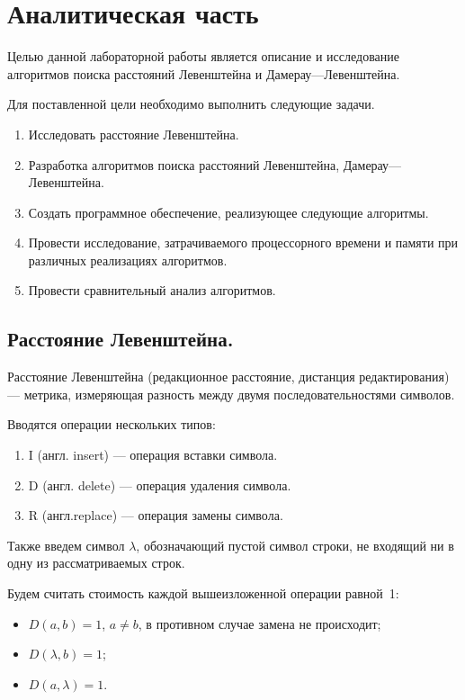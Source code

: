 \chapter{Аналитическая часть}
\label{sec:targets}
Целью данной лабораторной работы является описание и исследование алгоритмов поиска расстояний Левенштейна и Дамерау---Левенштейна.


Для поставленной цели необходимо выполнить следующие задачи.
\begin{enumerate}
	\item Исследовать расстояние Левенштейна.
	\item Разработка алгоритмов поиска расстояний Левенштейна, Дамерау---Левенштейна.
	\item Создать программное обеспечение, реализующее следующие алгоритмы.
	\item Провести исследование, затрачиваемого процессорного времени и памяти при различных реализациях алгоритмов.
	\item Провести сравнительный анализ алгоритмов.
\end{enumerate}

\section{Расстояние Левенштейна.}


Расстояние Левенштейна (редакционное расстояние, дистанция редактирования) --- метрика, измеряющая разность между двумя последовательностями символов. \cite{levenshtein}

Вводятся операции нескольких типов:
\begin{enumerate}
	\item I (англ. insert) --- операция вставки символа.
	\item D (англ. delete) --- операция удаления символа.
	\item R (англ.replace) --- операция замены символа.
\end{enumerate}
Также введем символ $\lambda$, обозначающий пустой символ строки, не входящий ни в одну из рассматриваемых строк.

Будем считать стоимость каждой вышеизложенной операции равной~1:
\begin{itemize}[label=---]
	\item $D(a, b) = 1$, $a \neq b$, в противном случае замена не происходит;
	\item $D(\lambda, b) = 1$;
	\item $D(a, \lambda) = 1$.
\end{itemize}


